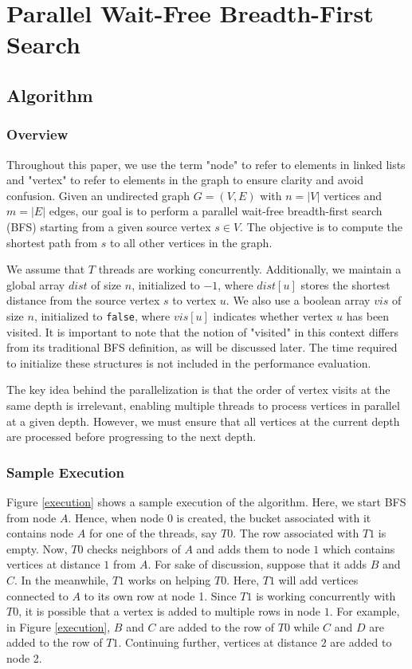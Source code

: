 \section{Parallel Wait-Free Breadth-First Search}
\label{bfs_sec}

\subsection{Algorithm}

\subsubsection{Overview}

Throughout this paper, we use the term "node" to refer to elements in linked lists and "vertex" to refer to elements in the graph to ensure clarity and avoid confusion. Given an undirected graph $G = (V, E)$ with $n = |V|$ vertices and $m = |E|$ edges, our goal is to perform a parallel wait-free breadth-first search (BFS) starting from a given source vertex $s \in V$. The objective is to compute the shortest path from $s$ to all other vertices in the graph.

We assume that $T$ threads are working concurrently. Additionally, we maintain a global array $dist$ of size $n$, initialized to $-1$, where $dist[u]$ stores the shortest distance from the source vertex $s$ to vertex $u$. We also use a boolean array $vis$ of size $n$, initialized to \texttt{false}, where $vis[u]$ indicates whether vertex $u$ has been visited. It is important to note that the notion of "visited" in this context differs from its traditional BFS definition, as will be discussed later. The time required to initialize these structures is not included in the performance evaluation.

The key idea behind the parallelization is that the order of vertex visits at the same depth is irrelevant, enabling multiple threads to process vertices in parallel at a given depth. However, we must ensure that all vertices at the current depth are processed before progressing to the next depth.

\subsubsection{Sample Execution}
Figure \ref{execution} shows a sample execution of the algorithm. Here, we start BFS from node $A$. Hence, when node $0$ is created, the bucket associated with it contains node $A$ for one of the threads, say $T0$. The row associated with $T1$ is empty. Now, $T0$ checks neighbors of $A$ and adds them to node $1$ which contains vertices at distance $1$ from $A$. For sake of discussion, suppose that it adds $B$ and $C$. In the meanwhile, $T1$ works on helping $T0$. Here, $T1$ will add vertices connected to $A$ to its own row at node 1. Since $T1$ is working concurrently with $T0$, it is possible that a vertex is added to multiple rows in node $1$. For example, in Figure \ref{execution}, $B$ and $C$ are added to the row of $T0$ while $C$ and $D$ are added to the row of $T1$. Continuing further, vertices at distance $2$ are added to node 2.

